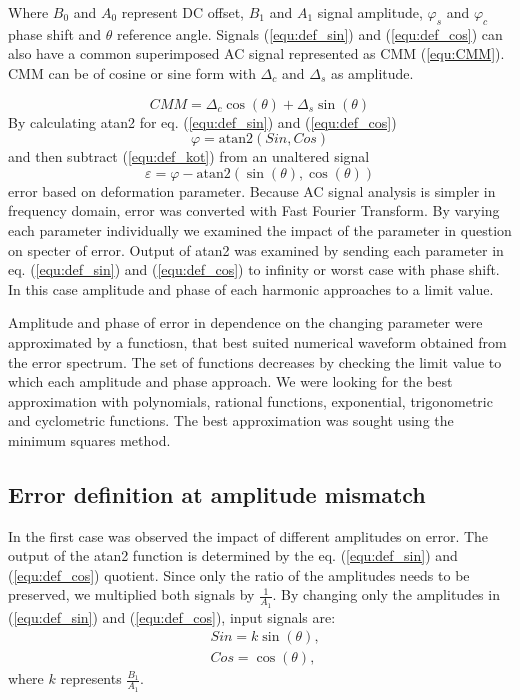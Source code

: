\documentclass[a4paper]{article}
\begin{document}
Where $B_0$ and $A_0$ represent DC offset, $B_1$ and $A_1$ signal amplitude, $\varphi_s$ and $\varphi_c$  phase shift and $\theta$ reference angle. Signals (\ref{equ:def_sin}) and (\ref{equ:def_cos}) can also have a common superimposed AC signal  represented as CMM (\ref{equ:CMM}). CMM can be of cosine or sine form with $\Delta_c$ and $\Delta_s$ as amplitude.

\begin{equation}
\label{equ:CMM}
CMM = \Delta_c \cos(\theta)+\Delta_s \sin(\theta)
\end{equation}
By calculating atan2 for eq. (\ref{equ:def_sin}) and (\ref{equ:def_cos})
\begin{equation}
\label{equ:def_kot}
\varphi = \mathrm{atan2}(Sin,Cos)
\end{equation}
and then subtract (\ref{equ:def_kot}) from an unaltered signal
\begin{equation}
\label{equ:def_err}
\varepsilon =\varphi - \mathrm{atan2}(\sin(\theta),\cos(\theta))
\end{equation}
error based on deformation parameter.  Because AC signal analysis is simpler in frequency domain, error was converted with Fast Fourier Transform. By varying each parameter individually we examined the impact of the parameter in question on specter of error. Output of atan2 was examined by sending each parameter in eq. (\ref{equ:def_sin}) and (\ref{equ:def_cos}) to infinity or worst case with phase shift.
In this case amplitude and phase of each harmonic approaches to a limit value.

Amplitude and phase of error  in dependence on the changing parameter were approximated by a functiosn, that best suited numerical waveform obtained from the error spectrum. The set of functions decreases by checking the limit value to which each amplitude and phase approach. We were looking for the best approximation with polynomials, rational functions, exponential, trigonometric and cyclometric functions. The best approximation was sought using the minimum squares method.

\subsection{Error definition at amplitude mismatch}
In the first case was observed the impact of different amplitudes on error. The output of the atan2 function is determined by the eq. (\ref{equ:def_sin}) and (\ref{equ:def_cos}) quotient. Since only the ratio of the amplitudes needs to be preserved, we multiplied both signals by $\frac{1}{A_1}$. By changing only the amplitudes in (\ref{equ:def_sin}) and (\ref{equ:def_cos}), input signals are:
	\begin{eqnarray}
	\label{equ:def_sin_ama}
	&Sin = k \sin(\theta),\\
	\label{equ:def_cos_amp}
	&Cos =\cos(\theta),
	\end{eqnarray}
where $k$ represents $\frac{B_1}{A_1}$.
\end{document}
